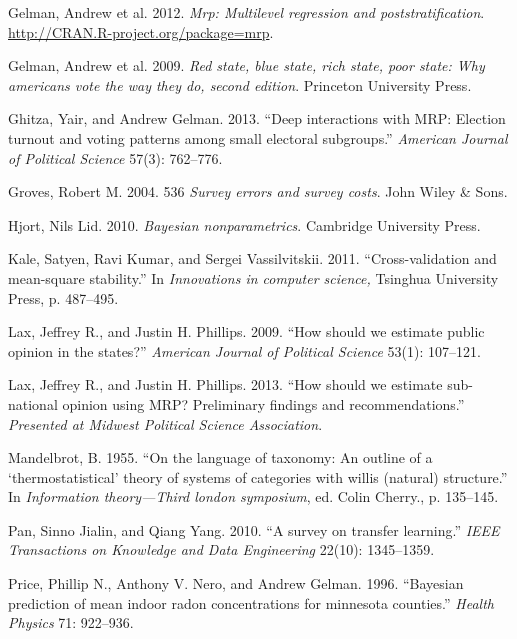 Gelman, Andrew et al. 2012. \emph{Mrp: Multilevel regression and
poststratification}. \url{http://CRAN.R-project.org/package=mrp}.

Gelman, Andrew et al. 2009. \emph{Red state, blue state, rich state,
poor state: Why americans vote the way they do, second edition}.
Princeton University Press.

Ghitza, Yair, and Andrew Gelman. 2013. ``Deep interactions with MRP:
Election turnout and voting patterns among small electoral subgroups.''
\emph{American Journal of Political Science} 57(3): 762--776.

Groves, Robert M. 2004. 536 \emph{Survey errors and survey costs}. John
Wiley \& Sons.

Hjort, Nils Lid. 2010. \emph{Bayesian nonparametrics}. Cambridge
University Press.

Kale, Satyen, Ravi Kumar, and Sergei Vassilvitskii. 2011.
``Cross-validation and mean-square stability.'' In \emph{Innovations in
computer science,} Tsinghua University Press, p. 487--495.

Lax, Jeffrey R., and Justin H. Phillips. 2009. ``How should we estimate
public opinion in the states?'' \emph{American Journal of Political
Science} 53(1): 107--121.

Lax, Jeffrey R., and Justin H. Phillips. 2013. ``How should we estimate
sub-national opinion using MRP? Preliminary findings and
recommendations.'' \emph{Presented at Midwest Political Science
Association}.

Mandelbrot, B. 1955. ``On the language of taxonomy: An outline of a
`thermostatistical' theory of systems of categories with willis
(natural) structure.'' In \emph{Information theory---Third london
symposium}, ed. Colin Cherry., p. 135--145.

Pan, Sinno Jialin, and Qiang Yang. 2010. ``A survey on transfer
learning.'' \emph{IEEE Transactions on Knowledge and Data Engineering}
22(10): 1345--1359.

Price, Phillip N., Anthony V. Nero, and Andrew Gelman. 1996. ``Bayesian
prediction of mean indoor radon concentrations for minnesota counties.''
\emph{Health Physics} 71: 922--936.

